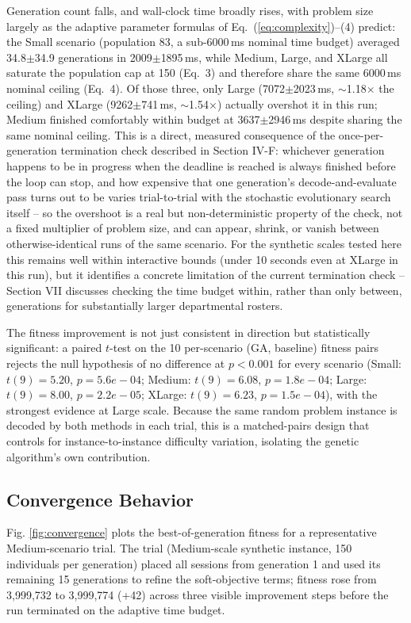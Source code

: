 \documentclass[conference]{IEEEtran}
\begin{document}
Generation count falls, and wall-clock time broadly rises, with problem size largely as the adaptive parameter formulas of Eq.~(\ref{eq:complexity})--(4) predict: the Small scenario (population 83, a sub-6000\,ms nominal time budget) averaged 34.8$\pm$34.9 generations in 2009$\pm$1895\,ms, while Medium, Large, and XLarge all saturate the population cap at 150 (Eq.~3) and therefore share the same 6000\,ms nominal ceiling (Eq.~4). Of those three, only Large (7072$\pm$2023\,ms, $\sim$1.18$\times$ the ceiling) and XLarge (9262$\pm$741\,ms, $\sim$1.54$\times$) actually overshot it in this run; Medium finished comfortably within budget at 3637$\pm$2946\,ms despite sharing the same nominal ceiling. This is a direct, measured consequence of the once-per-generation termination check described in Section IV-F: whichever generation happens to be in progress when the deadline is reached is always finished before the loop can stop, and how expensive that one generation's decode-and-evaluate pass turns out to be varies trial-to-trial with the stochastic evolutionary search itself -- so the overshoot is a real but non-deterministic property of the check, not a fixed multiplier of problem size, and can appear, shrink, or vanish between otherwise-identical runs of the same scenario. For the synthetic scales tested here this remains well within interactive bounds (under 10 seconds even at XLarge in this run), but it identifies a concrete limitation of the current termination check -- Section VII discusses checking the time budget within, rather than only between, generations for substantially larger departmental rosters.

The fitness improvement is not just consistent in direction but statistically significant: a paired $t$-test on the 10 per-scenario (GA, baseline) fitness pairs rejects the null hypothesis of no difference at $p<0.001$ for every scenario (Small: $t(9){=}5.20$, $p{=}5.6e-04$; Medium: $t(9){=}6.08$, $p{=}1.8e-04$; Large: $t(9){=}8.00$, $p{=}2.2e-05$; XLarge: $t(9){=}6.23$, $p{=}1.5e-04$), with the strongest evidence at Large scale. Because the same random problem instance is decoded by both methods in each trial, this is a matched-pairs design that controls for instance-to-instance difficulty variation, isolating the genetic algorithm's own contribution.

\subsection{Convergence Behavior}
Fig. \ref{fig:convergence} plots the best-of-generation fitness for a representative Medium-scenario trial. The trial (Medium-scale synthetic instance, 150 individuals per generation) placed all sessions from generation 1 and used its remaining 15 generations to refine the soft-objective terms; fitness rose from 3,999,732 to 3,999,774 (+42) across three visible improvement steps before the run terminated on the adaptive time budget.
\end{document}
